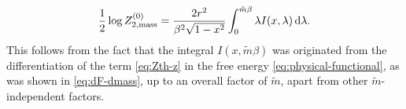 \documentclass[a4paper,11pt]{article}
\newcommand{\dd}{\mathrm d}
\begin{document}
\begin{equation}
 \frac12\log Z_{2,{\rm mass}}^{(0)}
 =\frac{2r^2}{\beta^2\sqrt{1-x^2}}
 \int_0^{\tilde m\beta}\lambda I(x,\lambda)\,\dd\lambda.
 \label{eq:Zth-lambda}
\end{equation}
This follows from the fact that the integral $I(x,\tilde m \beta)$ was originated from the differentiation of the term \eqref{eq:Zth-z} in the free energy \eqref{eq:physical-functional}, as was shown in \eqref{eq:dF-dmass}, up to an overall factor of $\tilde m$, apart from other $\tilde m$-independent factors.\\
\end{document}
